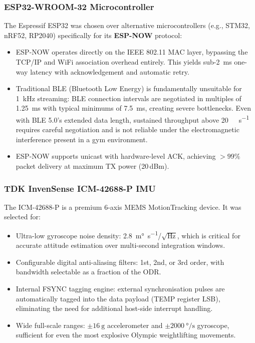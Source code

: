 \subsubsection{ESP32-WROOM-32 Microcontroller}
The Espressif ESP32 was chosen over alternative microcontrollers (e.g., STM32, nRF52, RP2040) specifically for its \textbf{ESP-NOW} protocol:
\begin{itemize}[nosep]
  \item ESP-NOW operates directly on the IEEE 802.11 MAC layer, bypassing the TCP/IP and WiFi association overhead entirely. This yields sub-\SI{2}{\milli\second} one-way latency with acknowledgement and automatic retry.
  \item Traditional BLE (Bluetooth Low Energy) is fundamentally unsuitable for \SI{1}{\kilo\hertz} streaming: BLE connection intervals are negotiated in multiples of \SI{1.25}{\milli\second} with typical minimums of \SI{7.5}{\milli\second}, creating severe bottlenecks. Even with BLE 5.0's extended data length, sustained throughput above \SI{20}{\kilo\byte\per\second} requires careful negotiation and is not reliable under the electromagnetic interference present in a gym environment.
  \item ESP-NOW supports unicast with hardware-level ACK, achieving $>99\%$ packet delivery at maximum TX power (20\,dBm).
\end{itemize}

\subsubsection{TDK InvenSense ICM-42688-P IMU}
The ICM-42688-P is a premium 6-axis MEMS MotionTracking device. It was selected for:
\begin{itemize}[nosep]
  \item Ultra-low gyroscope noise density: \SI{2.8}{\milli\degree\per\second}/$\sqrt{\text{Hz}}$, which is critical for accurate attitude estimation over multi-second integration windows.
  \item Configurable digital anti-aliasing filters: 1st, 2nd, or 3rd order, with bandwidth selectable as a fraction of the ODR.
  \item Internal FSYNC tagging engine: external synchronisation pulses are automatically tagged into the data payload (TEMP register LSB), eliminating the need for additional host-side interrupt handling.
  \item Wide full-scale ranges: $\pm\SI{16}{\g}$ accelerometer and $\pm\SI{2000}{\degree\per\second}$ gyroscope, sufficient for even the most explosive Olympic weightlifting movements.
\end{itemize}


